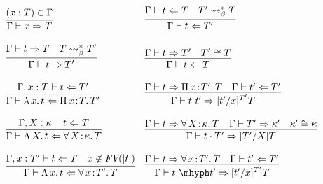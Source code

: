 \documentclass{article}
\newcommand{\abs}[4]{{#1}\, #2\! : \! #3.\, #4}
\newcommand{\absu}[3]{{#1}\, #2.\, #3}
\newcommand{\tpcheck}[0]{\Leftarrow}
\newcommand{\tpsynth}[0]{\Rightarrow}
\begin{document}
\begin{figure}
  \[
    \begin{array}{c}
  \begin{array}{ll}
    \infer{\Gamma\vdash x\tpsynth T}{(x : T)\in\Gamma} &
    \infer{\Gamma\vdash t\tpcheck T'}{\Gamma\vdash t \tpcheck T & T' \leadsto^*_\beta T} \\ \\    
    \infer{\Gamma\vdash t\tpsynth T'}{\Gamma\vdash t \tpsynth T & T \leadsto^*_\beta T'} &
    \infer{\Gamma\vdash t\tpcheck T}{\Gamma\vdash t\tpsynth T' & T' \cong T} \\ \\    
    \infer{\Gamma\vdash \absu{\lambda}{x}{t} \tpcheck \abs{\Pi}{x}{T}{T'}}{\Gamma,x:T\vdash t\tpcheck T'} &
    \infer{\Gamma\vdash t\ t' \tpsynth [t'/x]^{T'}T}{\Gamma\vdash t \tpsynth \abs{\Pi}{x}{T'}{T} & \Gamma\vdash t' \tpcheck T'} \\ \\

    \infer{\Gamma\vdash \absu{\Lambda}{X}{t} \tpcheck \abs{\forall}{X}{\kappa}{T}}{\Gamma,X:\kappa\vdash t \tpcheck T} &
    \infer{\Gamma\vdash t \cdot T' \tpsynth [T'/X]T}
          {\Gamma\vdash t \tpsynth \abs{\forall}{X}{\kappa}{T} & \Gamma\vdash T' \tpsynth \kappa' & \kappa'\cong\kappa} \\ \\

    \infer{\Gamma\vdash \absu{\Lambda}{x}{t} \tpcheck \abs{\forall}{x}{T'}{T}}{\Gamma,x:T'\vdash t \tpcheck T & x\not\in\textit{FV}(|t|)} &
    \infer{\Gamma\vdash t\ \mhyph t' \tpsynth [t'/x]^{T'}T}{\Gamma\vdash t \tpsynth \abs{\forall}{x}{T'}{T} & \Gamma\vdash t' \tpcheck T'} \\ \\


\end{array}
\end{array}\]
\end{figure}
\end{document}
